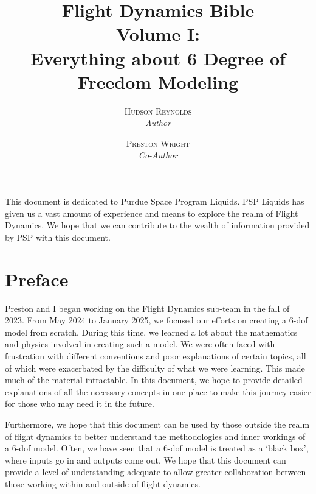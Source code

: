 \documentclass[12pt]{report}
\title{\Huge \textbf{Flight Dynamics Bible}  \\ \huge Volume I: \\Everything about 6 Degree of Freedom Modeling}
\author{\textsc{Hudson Reynolds} \\ \textit{Author}
\and
\textsc{Preston Wright} \\ \textit{Co-Author}
}
\newenvironment{dedication}
{
   \cleardoublepage
   \thispagestyle{empty}
   \vspace*{\stretch{1}}
   \hfill\begin{minipage}[t]{0.66\textwidth}
   \raggedright
}
{
   \end{minipage}
   \vspace*{\stretch{3}}
   \clearpage
}
\begin{document}
\pagestyle{fancy}
\renewcommand{\chaptermark}[1]{\markboth{#1}{#1}}
\fancyhead[R]{\thesection}
\fancyhead[L]{\thechapter\ --\ \leftmark}

\maketitle

%

\begin{dedication}
    This document is dedicated to Purdue Space Program Liquids. PSP Liquids has given us a vast amount of experience and means to explore the realm of Flight Dynamics. We hope that we can contribute to the wealth of information provided by PSP with this document.
\end{dedication}


\begin{spacing}{.5}
    \tableofcontents
    \lstlistoflistings
\end{spacing}


\chapter*{Preface}\label{sec:preface}
Preston and I began working on the Flight Dynamics sub-team in the fall of 2023. From May 2024 to January 2025, we focused our efforts on creating a 6-\gls{dof} model from scratch. During this time, we learned a lot about the mathematics and physics involved in creating such a model. We were often faced with frustration with different conventions and poor explanations of certain topics, all of which were exacerbated by the difficulty of what we were learning. This made much of the material intractable. In this document, we hope to provide detailed explanations of all the necessary concepts in one place to make this journey easier for those who may need it in the future. 

Furthermore, we hope that this document can be used by those outside the realm of flight dynamics to better understand the methodologies and inner workings of a 6-\gls{dof} model. Often, we have seen that a 6-\gls{dof} model is treated as a ‘black box’, where inputs go in and outputs come out. We hope that this document can provide a level of understanding adequate to allow greater collaboration between those working within and outside of flight dynamics.
\end{document}
